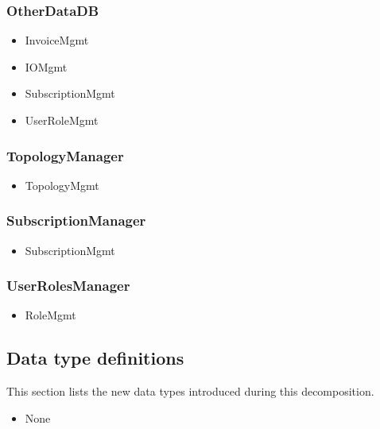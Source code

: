     \subsubsection{OtherDataDB}
        \begin{itemize}
            \item InvoiceMgmt
            \item IOMgmt
            \item SubscriptionMgmt
            \item UserRoleMgmt
        \end{itemize}

    \subsubsection{TopologyManager}
        \begin{itemize}
            \item TopologyMgmt
        \end{itemize}

    \subsubsection{SubscriptionManager}
        \begin{itemize}
            \item SubscriptionMgmt
        \end{itemize}

    \subsubsection{UserRolesManager}
        \begin{itemize}
            \item RoleMgmt
        \end{itemize}


\subsection{Data type definitions}
    This section lists the new data types introduced during this decomposition.

    \begin{itemize}
        \item None
    \end{itemize}
